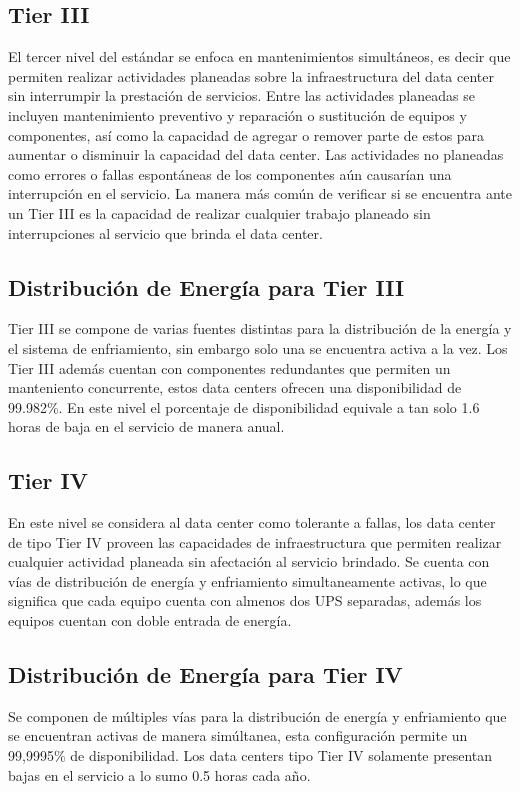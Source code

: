 \documentclass[journal]{IEEEtran}
\begin{document}
\subsection{Tier III}
El tercer nivel del estándar se enfoca en mantenimientos simultáneos, es decir que permiten realizar actividades planeadas sobre la infraestructura del data center sin interrumpir la prestación de servicios.
Entre las actividades planeadas se incluyen mantenimiento preventivo y reparación o sustitución de equipos y componentes, así como la capacidad de agregar o remover parte de estos para aumentar o disminuir la capacidad
del data center. 
Las actividades no planeadas como errores o fallas espontáneas de los componentes aún causarían una interrupción en el servicio. La manera más común de verificar si se encuentra ante un Tier III es la capacidad de realizar cualquier
trabajo planeado sin interrupciones al servicio que brinda el data center.
\subsection{Distribución de Energía para Tier III}
Tier III se compone de varias fuentes distintas para la distribución de la energía y el sistema de enfriamiento, sin embargo solo una se encuentra activa a la vez. Los Tier III además cuentan con componentes redundantes que permiten
un manteniento concurrente, estos data centers ofrecen una disponibilidad de 99.982\%. En este nivel el porcentaje de disponibilidad equivale a tan solo 1.6 horas de baja en el servicio de manera anual.
\subsection{Tier IV}
En este nivel se considera al data center como tolerante a fallas, los data center de tipo Tier IV proveen las capacidades de infraestructura que permiten realizar cualquier actividad planeada sin afectación al servicio 
brindado. Se cuenta con vías de distribución de energía y enfriamiento simultaneamente activas, lo que significa que cada equipo cuenta con almenos dos UPS separadas, además los equipos cuentan con doble entrada de energía.
\subsection{Distribución de Energía para Tier IV}
Se componen de múltiples vías para la distribución de energía y enfriamiento que se encuentran activas de manera simúltanea, esta configuración permite un 99,9995\% de disponibilidad. Los data centers tipo Tier IV solamente presentan bajas en el servicio a lo sumo 0.5 horas cada año.
\end{document}
